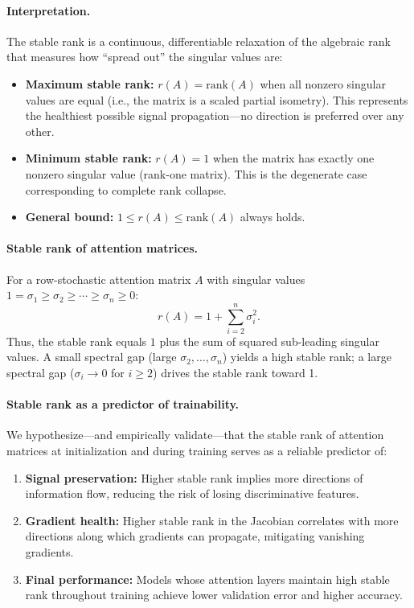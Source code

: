 \documentclass[12pt, a4paper]{article}
\begin{document}
\paragraph{Interpretation.}
The stable rank is a continuous, differentiable relaxation of the
algebraic rank that measures how ``spread out'' the singular values are:
\begin{itemize}[leftmargin=1.5em]
    \item \textbf{Maximum stable rank:} $r(A) = \text{rank}(A)$ when
          all nonzero singular values are equal (i.e., the matrix is a
          scaled partial isometry). This represents the healthiest
          possible signal propagation---no direction is preferred over
          any other.
    \item \textbf{Minimum stable rank:} $r(A) = 1$ when the matrix
          has exactly one nonzero singular value (rank-one matrix).
          This is the degenerate case corresponding to complete rank
          collapse.
    \item \textbf{General bound:} $1 \leq r(A) \leq \text{rank}(A)$
          always holds.
\end{itemize}

\paragraph{Stable rank of attention matrices.}
For a row-stochastic attention matrix $A$ with singular values
$1 = \sigma_1 \geq \sigma_2 \geq \cdots \geq \sigma_n \geq 0$:
\begin{equation}
    r(A) = 1 + \sum_{i=2}^{n} \sigma_i^2.
    \label{eq:sr_attention}
\end{equation}
Thus, the stable rank equals $1$ plus the sum of squared sub-leading
singular values. A small spectral gap (large $\sigma_2, \ldots,
\sigma_n$) yields a high stable rank; a large spectral gap
($\sigma_i \to 0$ for $i \geq 2$) drives the stable rank toward 1.

\paragraph{Stable rank as a predictor of trainability.}
We hypothesize---and empirically validate---that the stable rank of
attention matrices at initialization and during training serves as a
reliable predictor of:
\begin{enumerate}[label=(\roman*)]
    \item \textbf{Signal preservation:} Higher stable rank implies more
          directions of information flow, reducing the risk of losing
          discriminative features.
    \item \textbf{Gradient health:} Higher stable rank in the Jacobian
          correlates with more directions along which gradients can
          propagate, mitigating vanishing gradients.
    \item \textbf{Final performance:} Models whose attention layers
          maintain high stable rank throughout training achieve
          lower validation error and higher accuracy.
\end{enumerate}
\end{document}
